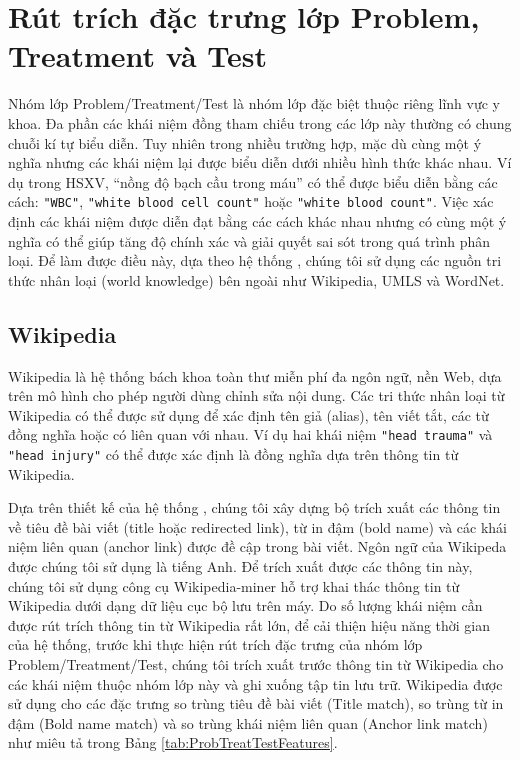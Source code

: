 \section{Rút trích đặc trưng lớp Problem, Treatment và Test}
Nhóm lớp Problem/Treatment/Test là nhóm lớp đặc biệt thuộc riêng lĩnh vực y khoa. Đa phần các khái niệm đồng tham chiếu trong các lớp này thường có chung chuỗi kí tự biểu diễn. Tuy nhiên trong nhiều trường hợp, mặc dù cùng một ý nghĩa nhưng các khái niệm lại được biểu diễn dưới nhiều hình thức khác nhau. Ví dụ trong HSXV, ``nồng độ bạch cầu trong máu'' có thể được biểu diễn bằng các cách: \texttt{"WBC"}, \texttt{"white blood cell count"} hoặc \texttt{"white blood count"}. Việc xác định các khái niệm được diễn đạt bằng các cách khác nhau nhưng có cùng một ý nghĩa có thể giúp tăng độ chính xác và giải quyết sai sót trong quá trình phân loại. Để làm được điều này, dựa theo hệ thống \cite{YanXu2012}, chúng tôi sử dụng các nguồn tri thức nhân loại (world knowledge) bên ngoài như Wikipedia, UMLS và WordNet.

\subsection*{Wikipedia}
Wikipedia là hệ thống bách khoa toàn thư miễn phí đa ngôn ngữ, nền Web, dựa trên mô hình cho phép người dùng chỉnh sửa nội dung. Các tri thức nhân loại từ Wikipedia có thể được sử dụng để xác định tên giả (alias), tên viết tắt, các từ đồng nghĩa hoặc có liên quan với nhau. Ví dụ hai khái niệm \texttt{"head trauma"} và \texttt{"head injury"} có thể được xác định là đồng nghĩa dựa trên thông tin từ Wikipedia.

Dựa trên thiết kế của hệ thống \cite{YanXu2012}, chúng tôi xây dựng bộ trích xuất các thông tin về tiêu đề bài viết (title hoặc redirected link), từ in đậm (bold name) và các khái niệm liên quan (anchor link) được đề cập trong bài viết. Ngôn ngữ của Wikipeda được chúng tôi sử dụng là tiếng Anh. Để trích xuất được các thông tin này, chúng tôi sử dụng công cụ Wikipedia-miner hỗ trợ khai thác thông tin từ Wikipedia dưới dạng dữ liệu cục bộ lưu trên máy. Do số lượng khái niệm cần được rút trích thông tin từ Wikipedia rất lớn, để cải thiện hiệu năng thời gian của hệ thống, trước khi thực hiện rút trích đặc trưng của nhóm lớp Problem/Treatment/Test, chúng tôi trích xuất trước thông tin từ Wikipedia cho các khái niệm thuộc nhóm lớp này và ghi xuống tập tin lưu trữ. Wikipedia được sử dụng cho các đặc trưng so trùng tiêu đề bài viết (Title match), so trùng từ in đậm (Bold name match) và so trùng khái niệm liên quan (Anchor link match) như miêu tả trong Bảng \ref{tab:ProbTreatTestFeatures}.

